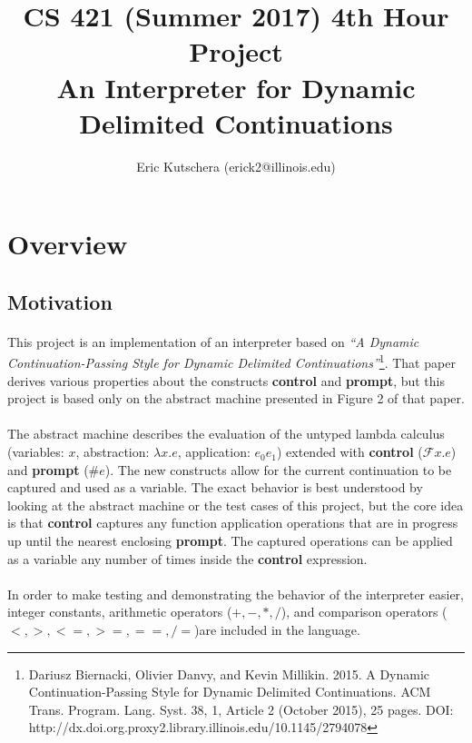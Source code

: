 \documentclass{article}
\begin{document}
\title{CS 421 (Summer 2017) 4th Hour Project\\\large{An Interpreter for Dynamic Delimited Continuations}}
\author{Eric Kutschera (erick2@illinois.edu)}
\maketitle

\section*{Overview}

\subsection*{Motivation}

\paragraph{}
This project is an implementation of an interpreter based on \textit{``A Dynamic Continuation-Passing Style for Dynamic Delimited Continuations''}\footnote{Dariusz Biernacki, Olivier Danvy, and Kevin Millikin. 2015. A Dynamic Continuation-Passing Style for Dynamic Delimited Continuations. ACM Trans. Program. Lang. Syst. 38, 1, Article 2 (October 2015), 25 pages. DOI: http://dx.doi.org.proxy2.library.illinois.edu/10.1145/2794078}. That paper derives various properties about the constructs \textbf{control} and \textbf{prompt}, but this project is based only on the abstract machine presented in Figure 2 of that paper.

\paragraph{}
The abstract machine describes the evaluation of the untyped lambda calculus (variables: $x$, abstraction: $\lambda x. e$, application: $e_0e_1$) extended with \textbf{control} ($\mathcal{F}x.e$) and \textbf{prompt} ($\#e$). The new constructs allow for the current continuation to be captured and used as a variable. The exact behavior is best understood by looking at the abstract machine or the test cases of this project, but the core idea is that \textbf{control} captures any function application operations that are in progress up until the nearest enclosing \textbf{prompt}. The captured operations can be applied as a variable any number of times inside the \textbf{control} expression.

\paragraph{}
In order to make testing and demonstrating the behavior of the interpreter easier, integer constants, arithmetic operators ($+,-,*,/$), and comparison operators ($<,>,<=,>=,==,/=$)are included in the language.
\end{document}
